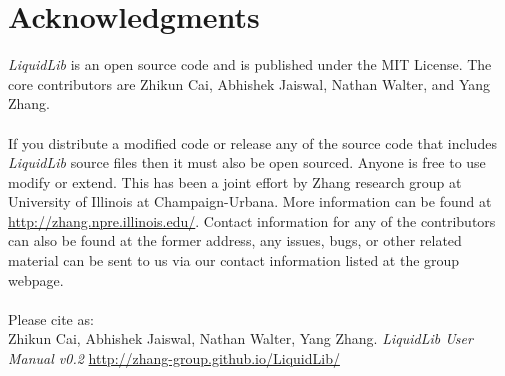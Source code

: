 \documentclass{article}
\begin{document}
\section{Acknowledgments}
\textit{LiquidLib} is an open source code and is published under the MIT License.  The core contributors are Zhikun Cai, Abhishek Jaiswal, Nathan Walter, and Yang Zhang.   
\\
\\
If you distribute a modified code or release any of the source code that includes \textit{LiquidLib} source files then it must also be open sourced.  Anyone is free to use modify or extend.  This has been a joint effort by Zhang research group at University of Illinois at Champaign-Urbana.  More information can be found at \url{http://zhang.npre.illinois.edu/}.  Contact information for any of the contributors can also be found at the former address, any issues, bugs, or other related material can be sent to us via our contact information listed at the group webpage.
\\
\\
Please cite as:\\
\hspace*{1cm}Zhikun Cai, Abhishek Jaiswal, Nathan Walter, Yang Zhang. \textit{LiquidLib User Manual v0.2} \url{http://zhang-group.github.io/LiquidLib/} 
\end{document}
